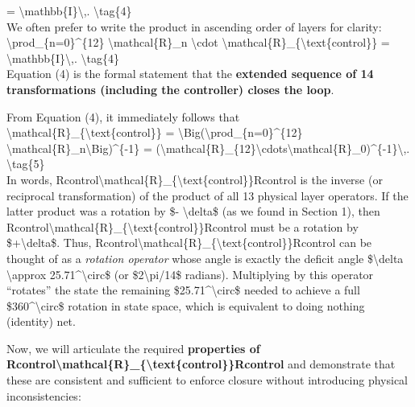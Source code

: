 \documentclass[
]{article}
\begin{document}
= \textbackslash mathbb\{I\}\textbackslash,. \textbackslash tag\{4\}\\
We often prefer to write the product in ascending order of layers for
clarity:\\
\textbackslash prod\_\{n=0\}\^{}\{12\} \textbackslash mathcal\{R\}\_n
\textbackslash cdot
\textbackslash mathcal\{R\}\_\{\textbackslash text\{control\}\} =
\textbackslash mathbb\{I\}\textbackslash,.
\textbackslash tag\{4\textquotesingle\}\\
Equation (4\textquotesingle) is the formal statement that the
\textbf{extended sequence of 14 transformations (including the
controller) closes the loop}.

From Equation (4\textquotesingle), it immediately follows that\\
\textbackslash mathcal\{R\}\_\{\textbackslash text\{control\}\} =
\textbackslash Big(\textbackslash prod\_\{n=0\}\^{}\{12\}
\textbackslash mathcal\{R\}\_n\textbackslash Big)\^{}\{-1\} =
(\textbackslash mathcal\{R\}\_\{12\}\textbackslash cdots\textbackslash mathcal\{R\}\_0)\^{}\{-1\}\textbackslash,.
\textbackslash tag\{5\}\\
In words,
Rcontrol\textbackslash mathcal\{R\}\_\{\textbackslash text\{control\}\}Rcontrol\hspace{0pt}
is the inverse (or reciprocal transformation) of the product of all 13
physical layer operators. If the latter product was a rotation by \$-
\textbackslash delta\$ (as we found in Section 1), then
Rcontrol\textbackslash mathcal\{R\}\_\{\textbackslash text\{control\}\}Rcontrol\hspace{0pt}
must be a rotation by \$+\textbackslash delta\$. Thus,
Rcontrol\textbackslash mathcal\{R\}\_\{\textbackslash text\{control\}\}Rcontrol\hspace{0pt}
can be thought of as a \emph{rotation operator} whose angle is exactly
the deficit angle \$\textbackslash delta \textbackslash approx
25.71\^{}\textbackslash circ\$ (or \$2\textbackslash pi/14\$ radians).
Multiplying by this operator ``rotates'' the state the remaining
\$25.71\^{}\textbackslash circ\$ needed to achieve a full
\$360\^{}\textbackslash circ\$ rotation in state space, which is
equivalent to doing nothing (identity) net.

Now, we will articulate the required \textbf{properties of
Rcontrol\textbackslash mathcal\{R\}\_\{\textbackslash text\{control\}\}Rcontrol\hspace{0pt}}
and demonstrate that these are consistent and sufficient to enforce
closure without introducing physical inconsistencies:
\end{document}
